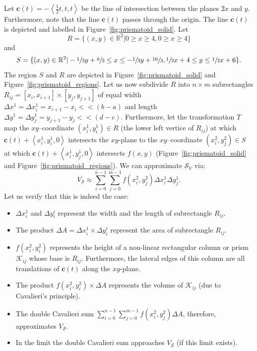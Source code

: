 \documentclass{article}
\theoremstyle{theorem}
\theoremstyle{definition}
\begin{document}
Let $\mathbf{c}(t) = -\left<\frac{1}{2}t,t,t\right>$ be the line of intersection between the planes $2x$ and $y$. Furthermore, note that the line 
$\mathbf{c}(t)$ passes through the origin. The line $\mathbf{c}(t)$ is depicted and labelled in Figure~\ref{fig:prismatoid_solid}. Let 
\begin{equation}
R = \{(x,y)\in\mathbb{R}^2|0 \geq x \geq 4, 0 \geq x \geq 4\} \nonumber
\end{equation}
and
\begin{equation}
S = \{(x,y)\in\mathbb{R}^2|-\sfrac{1}{3}y+\sfrac{8}{3}\leq x\leq -\sfrac{1}{3}y+\sfrac{16}{3}, \sfrac{1}{2} x + 4\leq y \leq \sfrac{1}{2} x + 6 \}. \nonumber
\end{equation}
The region $S$ and $R$ are depicted in Figure~\ref{fig:prismatoid_solid} and Figure~\ref{fig:prismatoid_regions}. Let us now subdivide $R$ into $n\times m$
subrectangles $R_{ij} = [x_{i},x_{i+1}] \times [y_{j},y_{j+1}]$ of equal width $\Delta x^1 = \Delta x_i^1 = x_{i+1}-x_i<<(b-a)$ and length $\Delta y^1= \Delta y_j^1 = y_{j+1}-y_j<<(d-c)$. 
Furthermore, let the transformation $T$ map the $xy$--coordinate $(x_i^1,y_i^1)\in R$ (the lower left vertice of $R_{ij}$) at which $\mathbf{c}(t) + \left <x_i^1,y_i^1,0 \right >$ intersects the 
$xy$-plane to the $xy$--coordinate $(x_i^2,y_j^2)\in S$ at which $\mathbf{c}(t) + \left <x_i^1,y_j^1,0 \right >$ intersects $f(x,y)$ (Figure~\ref{fig:prismatoid_solid} and Figure~\ref{fig:prismatoid_regions}). 
We can approximate $\mathcal{S}_V$ via:
\begin{equation}
V_{\mathcal{S}} \approx \sum_{i=0}^{n-1} \sum_{j=0}^{m-1} f(x_i^2,y_j^2) \Delta x_i^1 \Delta y_j^1.
\end{equation}
Let us verify that this is indeed the case:
\begin{itemize}
\item $\Delta x_i^1$ and $\Delta y_i^i$ represent the width and the length of subrectangle $R_{ij}$.
\item The product $\Delta A = \Delta x_i^1\times \Delta y_i^i$ represent the area of subrectangle $R_{ij}$.
\item $f(x_i^2,y_i^2)$ represents the height of a non-linear rectangular column or prism $\mathcal{K}_{ij}$ whose base is $R_{ij}$. Furthermore, the lateral edges of this column are all translations 
of $\mathbf{c}(t)$ along the $xy$-plane. 
\item The product $f(x_i^2,y_i^2)\times \Delta A$ represents the volume of $\mathcal{K}_{ij}$ (due to Cavalieri's principle).
\item The double Cavalieri sum $\sum_{i=0}^{n-1} \sum_{j=0}^{m-1} f(x_i^2,y_j^2) \Delta A$, therefore, approximates $V_{\mathcal{S}}$. 
\item In the limit the double Cavalieri sum approaches $V_{\mathcal{S}}$ (if this limit exists). 
\end{itemize}
\end{document}
